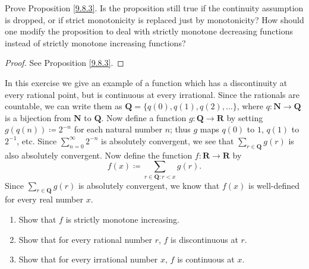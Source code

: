 \begin{exercise}\label{ex 9.8.4}
    Prove Proposition \ref{9.8.3}.
    Is the proposition still true if the continuity assumption is dropped, or if strict monotonicity is replaced just by monotonicity?
    How should one modify the proposition to deal with strictly monotone decreasing functions instead of strictly monotone increasing functions?
\end{exercise}

\begin{proof}
    See Proposition \ref{9.8.3}.
\end{proof}

\begin{exercise}\label{ex 9.8.5}
    In this exercise we give an example of a function which has a discontinuity at every rational point, but is continuous at every irrational.
    Since the rationals are countable, we can write them as \(\mathbf{Q} = \{q(0), q(1), q(2), \dots\}\), where \(q : \mathbf{N} \to \mathbf{Q}\) is a bijection from \(\mathbf{N}\) to \(\mathbf{Q}\).
    Now define a function \(g : \mathbf{Q} \to \mathbf{R}\) by setting \(g(q(n)) \coloneqq 2^{-n}\) for each natural number \(n\);
    thus \(g\) maps \(q(0)\) to \(1\), \(q(1)\) to \(2^{-1}\), etc.
    Since \(\sum_{n = 0}^\infty 2^{-n}\) is absolutely convergent, we see that \(\sum_{r \in \mathbf{Q}} g(r)\) is also absolutely convergent.
    Now define the function \(f : \mathbf{R} \to \mathbf{R}\) by
    \[
        f(x) \coloneqq \sum_{r \in \mathbf{Q} : r < x} g(r).
    \]
    Since \(\sum_{r \in \mathbf{Q}} g(r)\) is absolutely convergent, we know that \(f(x)\) is well-defined for every real number \(x\).
    \begin{enumerate}
        \item Show that \(f\) is strictly monotone increasing.
        \item Show that for every rational number \(r\), \(f\) is discontinuous at \(r\).
        \item Show that for every irrational number \(x\), \(f\) is continuous at \(x\).
    \end{enumerate}
\end{exercise}